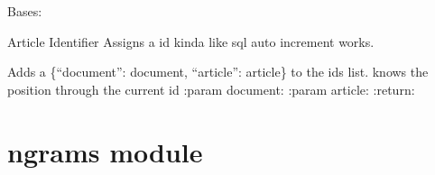 \documentclass[letterpaper,10pt,english]{sphinxmanual}
\begin{document}
\begin{fulllineitems}
\label{\detokenize{identifier:identifier.Identifier}}
Bases: 

Article Identifier
Assigns a id kinda like sql auto increment works.

\begin{fulllineitems}
\label{\detokenize{identifier:identifier.Identifier.assign}}
Adds a \{``document'': document, ``article'': article\} to the ids list.
knows the position through the current id
:param document:
:param article:
:return:

\end{fulllineitems}


\begin{fulllineitems}
\label{\detokenize{identifier:identifier.Identifier.retrieve}}
\end{fulllineitems}


\end{fulllineitems}



\chapter{ngrams module}
\label{\detokenize{ngrams:ngrams-module}}\label{\detokenize{ngrams::doc}}\label{\detokenize{ngrams:module-ngrams}}
\end{document}
